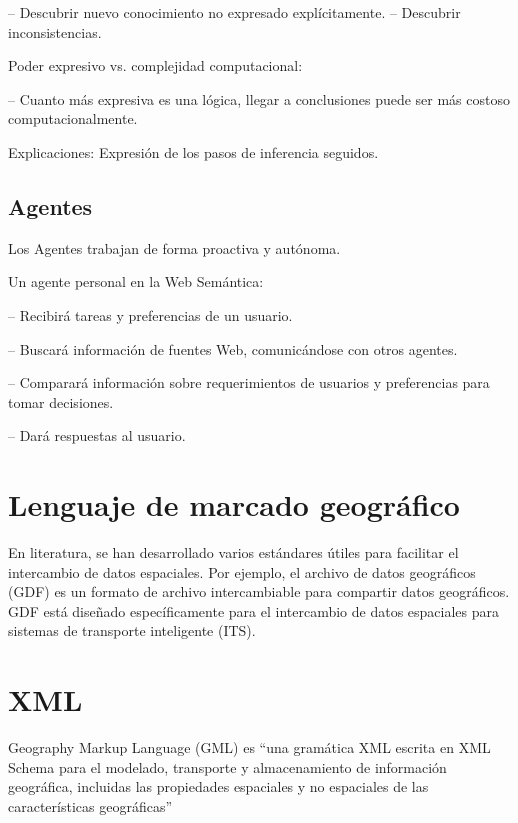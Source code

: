 – Descubrir nuevo conocimiento no expresado explícitamente. 
– Descubrir inconsistencias.

Poder expresivo vs. complejidad computacional:

– Cuanto más expresiva es una lógica, llegar a conclusiones puede ser más costoso computacionalmente.

Explicaciones: Expresión de los pasos de inferencia seguidos.


\subsection{Agentes}


Los Agentes trabajan de forma proactiva y autónoma.


Un agente personal en la Web Semántica:

– Recibirá tareas y preferencias de un usuario.

– Buscará información de fuentes Web, comunicándose con otros agentes.

– Comparará información sobre requerimientos de usuarios y preferencias para tomar decisiones.

– Dará respuestas al usuario.


\section{Lenguaje de marcado geográfico}

En literatura, se han desarrollado varios estándares útiles para facilitar el intercambio de datos espaciales. Por ejemplo, el archivo de datos geográficos (GDF) es un formato de archivo intercambiable para compartir datos geográficos. GDF está diseñado específicamente para el intercambio de datos espaciales para sistemas de transporte inteligente (ITS).




\section{XML}

Geography Markup Language (GML) es “una gramática XML escrita en XML Schema para el modelado, transporte y almacenamiento de información geográfica, incluidas las propiedades espaciales y no espaciales de las características geográficas”

